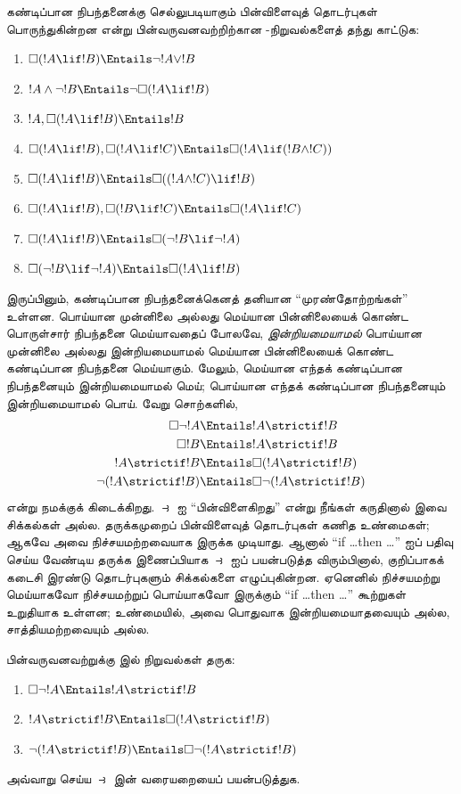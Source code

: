 \documentclass[../../../include/open-logic-section]{subfiles}
\begin{document}
\begin{prob}
  கண்டிப்பான நிபந்தனைக்கு செல்லுபடியாகும் பின்விளைவுத் தொடர்புகள்
  பொருந்துகின்றன என்று பின்வருவனவற்றிற்கான -நிறுவல்களைத் தந்து
  காட்டுக:
  \begin{enumerate}
  \item  $\Box(!A \lif !B) \Entails \lnot !A \lor !B$
  \item $!A \land \lnot !B \Entails \lnot\Box(!A \lif !B)$
  \item $!A, \Box(!A \lif !B) \Entails !B$
  \item $\Box(!A \lif !B), \Box(!A \lif !C) \Entails \Box(!A \lif (!B
    \land !C))$
  \item $\Box(!A \lif !B) \Entails \Box((!A \land !C) \lif !B)$
  \item $\Box(!A \lif !B), \Box(!B \lif !C) \Entails \Box(!A
    \lif !C)$
  \item $\Box(!A \lif !B) \Entails \Box(\lnot !B \lif \lnot !A)$
  \item $\Box(\lnot !B \lif \lnot !A) \Entails \Box(!A \lif !B)$
  \end{enumerate}
\end{prob}

இருப்பினும், கண்டிப்பான நிபந்தனைக்கெனத் தனியான ``முரண்தோற்றங்கள்''
உள்ளன. பொய்யான முன்னிலை அல்லது மெய்யான பின்னிலையைக் கொண்ட பொருள்சார்
நிபந்தனை மெய்யாவதைப் போலவே, \emph{இன்றியமையாமல்} பொய்யான முன்னிலை அல்லது
இன்றியமையாமல் மெய்யான பின்னிலையைக் கொண்ட கண்டிப்பான நிபந்தனை மெய்யாகும்.
மேலும், மெய்யான எந்தக் கண்டிப்பான நிபந்தனையும் இன்றியமையாமல் மெய்;
பொய்யான எந்தக் கண்டிப்பான நிபந்தனையும் இன்றியமையாமல் பொய். வேறு சொற்களில்,
\begin{align}
  \Box \lnot !A & \Entails !A \strictif !B\\
  \Box !B & \Entails !A \strictif !B\\
  !A \strictif !B& \Entails \Box(!A \strictif !B)\\
  \lnot(!A \strictif !B) & \Entails \Box\lnot(!A \strictif !B)
\end{align}
என்று நமக்குக் கிடைக்கிறது. $\strictif$ ஐ ``பின்விளைகிறது'' என்று
நீங்கள் கருதினால் இவை சிக்கல்கள் அல்ல. தருக்கமுறைப் பின்விளைவுத் தொடர்புகள்
கணித உண்மைகள்; ஆகவே அவை நிச்சயமற்றவையாக இருக்க முடியாது. ஆனால் ``if
\dots then \dots'' ஐப் பதிவு செய்ய வேண்டிய தருக்க இணைப்பியாக $\strictif$
ஐப் பயன்படுத்த விரும்பினால், குறிப்பாகக் கடைசி இரண்டு தொடர்புகளும்
சிக்கல்களை எழுப்புகின்றன. ஏனெனில் நிச்சயமற்று மெய்யாகவோ நிச்சயமற்றுப்
பொய்யாகவோ இருக்கும் ``if \dots then \dots'' கூற்றுகள் உறுதியாக உள்ளன;
உண்மையில், அவை பொதுவாக இன்றியமையாதவையும் அல்ல, சாத்தியமற்றவையும் அல்ல.

\begin{prob}
  பின்வருவனவற்றுக்கு  இல் நிறுவல்கள் தருக:
  \begin{enumerate}
    \item  $\Box \lnot !A \Entails !A \strictif !B$
    \item $!A \strictif !B \Entails \Box(!A \strictif !B)$
    \item $\lnot(!A \strictif !B)  \Entails \Box\lnot(!A \strictif !B)$
  \end{enumerate}
  அவ்வாறு செய்ய $\strictif$ இன் வரையறையைப் பயன்படுத்துக.
\end{prob}
\end{document}
